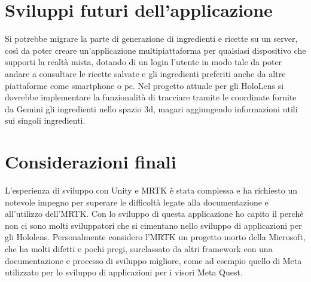 \section{Sviluppi futuri dell'applicazione}
Si potrebbe migrare la parte di generazione di ingredienti e ricette su un server, così da poter creare un'applicazione multipiattaforma per qualsiasi dispositivo che supporti la realtà mista, dotando di un login l'utente in modo tale da poter andare a consultare le ricette salvate e gli ingredienti preferiti anche da altre piattaforme come smartphone o pc. Nel progetto attuale per gli HoloLens si dovrebbe implementare la funzionalità di tracciare tramite le coordinate fornite da Gemini gli ingredienti nello spazio 3d, magari aggiungendo informazioni utili sui singoli ingredienti.

\section{Considerazioni finali}
L'esperienza di sviluppo con Unity e MRTK è stata complessa e ha richiesto un notevole impegno per superare le difficoltà legate alla documentazione e all'utilizzo dell'MRTK. Con lo sviluppo di questa applicazione ho capito il perchè non ci sono molti sviluppatori che si cimentano nello sviluppo di applicazioni per gli Hololens. Personalmente considero l'MRTK un progetto morto della Microsoft, che ha molti difetti e pochi pregi, surclassato da altri framework con una documentazione e processo di sviluppo migliore, come ad esempio quello di Meta utilizzato per lo sviluppo di applicazioni per i visori Meta Quest.